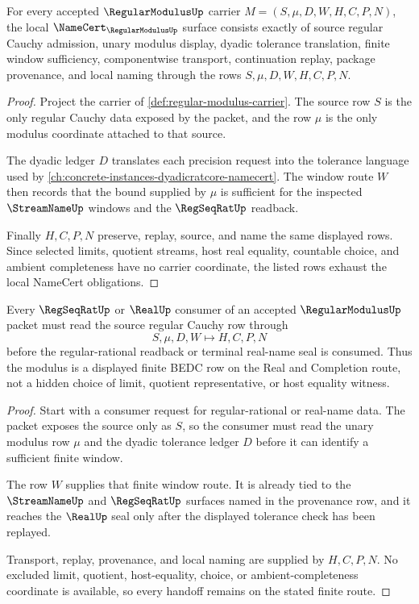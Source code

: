 \begin{theorem}
\label{thm:regular-modulus-namecert-obligations}
For every accepted $\RegularModulusUp$ carrier $M=(S,\mu,D,W,H,C,P,N)$, the local $\NameCert_{\RegularModulusUp}$ surface consists exactly of source regular Cauchy admission, unary modulus display, dyadic tolerance translation, finite window sufficiency, componentwise transport, continuation replay, package provenance, and local naming through the rows $S,\mu,D,W,H,C,P,N$.
\end{theorem}
\begin{proof}
Project the carrier of \autoref{def:regular-modulus-carrier}. The source row $S$ is the only regular Cauchy data exposed by the packet, and the row $\mu$ is the only modulus coordinate attached to that source.

The dyadic ledger $D$ translates each precision request into the tolerance language used by \autoref{ch:concrete-instances-dyadicratcore-namecert}. The window route $W$ then records that the bound supplied by $\mu$ is sufficient for the inspected $\StreamNameUp$ windows and the $\RegSeqRatUp$ readback.

Finally $H,C,P,N$ preserve, replay, source, and name the same displayed rows. Since selected limits, quotient streams, host real equality, countable choice, and ambient completeness have no carrier coordinate, the listed rows exhaust the local NameCert obligations.
\end{proof}

\begin{theorem}
\label{thm:regular-modulus-regseqrat-handoff}
Every $\RegSeqRatUp$ or $\RealUp$ consumer of an accepted $\RegularModulusUp$ packet must read the source regular Cauchy row through
$$
S,\mu,D,W \longmapsto H,C,P,N
$$
before the regular-rational readback or terminal real-name seal is consumed. Thus the modulus is a displayed finite BEDC row on the Real and Completion route, not a hidden choice of limit, quotient representative, or host equality witness.
\end{theorem}
\begin{proof}
Start with a consumer request for regular-rational or real-name data. The packet exposes the source only as $S$, so the consumer must read the unary modulus row $\mu$ and the dyadic tolerance ledger $D$ before it can identify a sufficient finite window.

The row $W$ supplies that finite window route. It is already tied to the $\StreamNameUp$ and $\RegSeqRatUp$ surfaces named in the provenance row, and it reaches the $\RealUp$ seal only after the displayed tolerance check has been replayed.

Transport, replay, provenance, and local naming are supplied by $H,C,P,N$. No excluded limit, quotient, host-equality, choice, or ambient-completeness coordinate is available, so every handoff remains on the stated finite route.
\end{proof}

